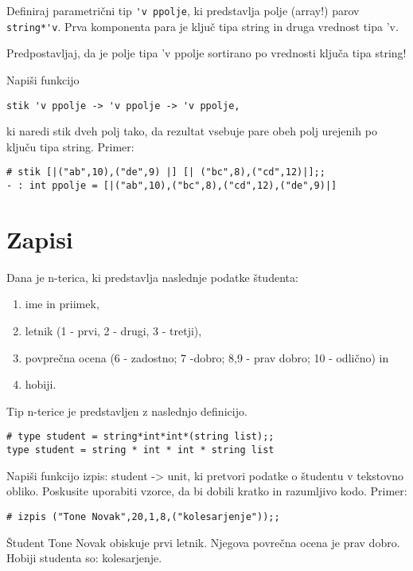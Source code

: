 \begin{ex}
Definiraj parametri\v cni tip 
\lstinline{'v ppolje}, ki predstavlja polje (array!) parov
\lstinline{string*'v}. Prva komponenta para je klju\v c tipa string in druga vrednost tipa 'v.

Predpostavljaj, da je polje tipa 'v ppolje sortirano po vrednosti klju\v ca tipa string!  

Napi\v si funkcijo
\begin{lstlisting}
stik 'v ppolje -> 'v ppolje -> 'v ppolje, 
\end{lstlisting}
ki naredi stik dveh polj tako, da rezultat vsebuje pare obeh polj urejenih po klju\v cu tipa string. 
Primer:

\begin{lstlisting}
# stik [|("ab",10),("de",9) |] [| ("bc",8),("cd",12)|];;
- : int ppolje = [|("ab",10),("bc",8),("cd",12),("de",9)|]

\end{lstlisting}

\end{ex} 




\section{Zapisi}




\begin{ex}
Dana je n-terica, ki predstavlja naslednje podatke \v studenta:
\begin{enumerate}
\item ime in priimek,
\item letnik (1 - prvi, 2 - drugi, 3 - tretji),
\item povpre\v cna ocena (6 - zadostno; 7 -dobro; 8,9 - prav dobro; 10 - odli\v cno) in
\item hobiji.
\end{enumerate}

Tip n-terice je predstavljen z naslednjo definicijo.
\begin{lstlisting}
# type student = string*int*int*(string list);;
type student = string * int * int * string list
\end{lstlisting}

Napi\v si funkcijo izpis: student -> unit, ki pretvori podatke o \v studentu v tekstovno obliko. Poskusite uporabiti vzorce, da bi dobili kratko in razumljivo kodo.
Primer: 
\begin{lstlisting}
# izpis ("Tone Novak",20,1,8,("kolesarjenje"));; 
\end{lstlisting}
\v Student Tone Novak obiskuje prvi letnik. Njegova povre\v cna ocena je prav dobro. Hobiji studenta so: kolesarjenje.
\end{ex}




